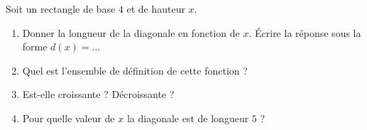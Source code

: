 
\begin{exercice}\label{exoSeconde-0076}

Soit un rectangle de base \( 4\) et de hauteur \( x\).
\begin{multicols}{2}
    \begin{enumerate}
        \item
            Donner la longueur de la diagonale en fonction de \( x\). Écrire la réponse sous la forme \( d(x)=\ldots\)
        \item
            Quel est l'ensemble de définition de cette fonction ?
        \item
            Est-elle croissante ? Décroissante ?
        \item
            Pour quelle valeur de \( x\) la diagonale est de longueur \( 5\) ?
    \end{enumerate}
\end{multicols}


\end{exercice}
